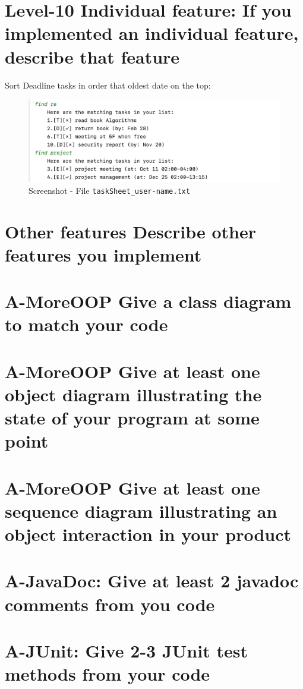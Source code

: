 \documentclass[a4paper,11pt, twoside]{article}
\begin{document}
\begin{table} [htbp]
\section* {Level-10 Individual feature: If you implemented an individual feature, describe that feature} 
Sort Deadline tasks in order that oldest date on the top:
\begin{figure}[H]
\centering
\includegraphics[width = 15.4cm]{find.png}
\caption{Screenshot - File \texttt{taskSheet\_user-name.txt}} 
\end{figure} 

\section* {Other features Describe other features you implement} 

\section* {A-MoreOOP Give a class diagram to match your code} 

\section* {A-MoreOOP Give at least one object diagram illustrating the state of your program at some point} 

\section* {A-MoreOOP Give at least one sequence diagram illustrating an object interaction in your product} 

\section* {A-JavaDoc: Give at least 2 javadoc comments from you code} 

\section* {A-JUnit: Give 2-3 JUnit test methods from your code} 


\end{table}
\end{document}
